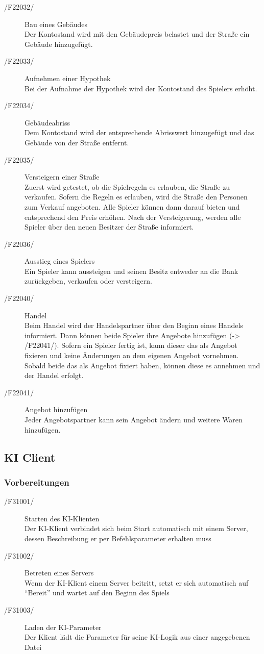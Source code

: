 \documentclass[a4paper,10pt]{article}
\begin{document}
\begin{description}
\item[/F22032/] Bau eines Gebäudes \\
Der Kontostand wird mit den Gebäudepreis belastet und der Straße ein Gebäude hinzugefügt.
\item[/F22033/] Aufnehmen einer Hypothek \\
Bei der Aufnahme der Hypothek wird der Kontostand des Spielers erhöht.
\item[/F22034/] Gebäudeabriss \\
Dem Kontostand wird der entsprechende Abrisswert hinzugefügt und das Gebäude von der Straße entfernt.
\item[/F22035/] Versteigern einer Straße \\
Zuerst wird getestet, ob die Spielregeln es erlauben, die Straße zu verkaufen. Sofern die Regeln es erlauben, wird die Straße den Personen zum Verkauf angeboten. Alle Spieler können dann darauf bieten und entsprechend den Preis erhöhen. Nach der Versteigerung, werden alle Spieler über den neuen Besitzer der Straße informiert.
\item[/F22036/] Ausstieg eines Spielers \\
Ein Spieler kann aussteigen und seinen Besitz entweder an die Bank zurückgeben, verkaufen oder versteigern.
\item[/F22040/] Handel \\
Beim Handel wird der Handelspartner über den Beginn eines Handels informiert. Dann können beide Spieler ihre Angebote hinzufügen (-> /F22041/). Sofern ein Spieler fertig ist, kann dieser das als Angebot fixieren und keine Änderungen an dem eigenen Angebot vornehmen. Sobald beide das als Angebot fixiert haben, können diese es annehmen und der Handel erfolgt.
\item[/F22041/] Angebot hinzufügen \\
Jeder Angebotspartner kann sein Angebot ändern und weitere Waren hinzufügen.
\end{description}

\subsection{KI Client}
\subsubsection{Vorbereitungen}
\begin{description}
\item[/F31001/]Starten des KI-Klienten\\
Der KI-Klient verbindet sich beim Start automatisch mit einem Server, dessen Beschreibung er per Befehlsparameter erhalten muss
\item[/F31002/]Betreten eines Servers\\
Wenn der KI-Klient einem Server beitritt, setzt er sich automatisch auf "`Bereit"' und wartet auf den Beginn des Spiels
\item[/F31003/] Laden der KI-Parameter \\
Der Klient lädt die Parameter für seine KI-Logik aus einer angegebenen Datei
\end{description}
\end{document}
